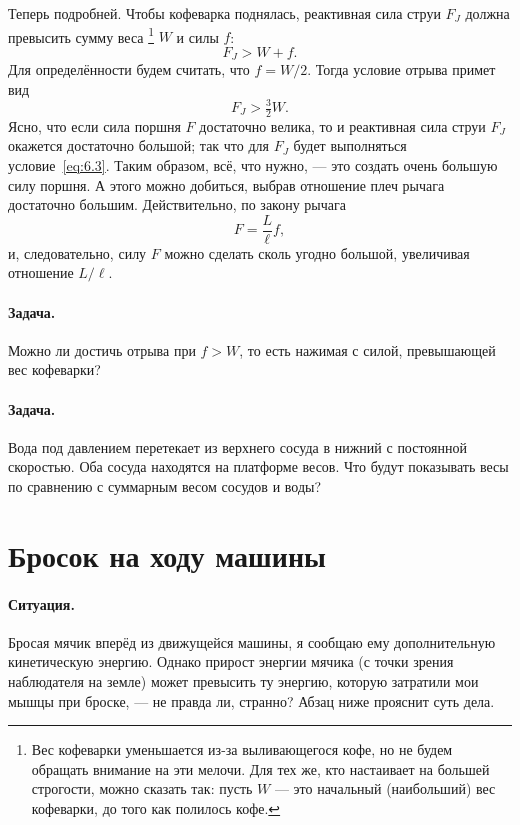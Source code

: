 Теперь подробней.
Чтобы кофеварка поднялась, реактивная сила струи $F_J$ должна превысить сумму веса%
\footnote{Вес кофеварки уменьшается из-за выливающегося кофе, но не будем обращать внимание на эти мелочи.
Для тех же, кто настаивает на большей строгости, можно сказать так: пусть $W$ --- это начальный (наибольший) вес кофеварки, до того как полилось кофе.}
$W$ и силы $f$:
\begin{equation}
F_J>W+f.
\label{eq:6.2}
\end{equation}
Для определённости будем считать, что $f=W/2$.
Тогда условие отрыва примет вид
\begin{equation}
F_J > \tfrac32W.
\label{eq:6.3}
\end{equation}
Ясно, что если сила поршня $F$ достаточно велика,
то и реактивная сила струи $F_J$ окажется достаточно большой;
так что для $F_J$ будет выполняться условие~\eqref{eq:6.3}.
Таким образом, всё, что нужно, --- это создать очень большую силу поршня.
А этого можно добиться, выбрав отношение плеч рычага достаточно большим.
Действительно, по закону рычага
\[
F=\frac{L}{\ell} f,
\]
и, следовательно, силу $F$ можно сделать сколь угодно большой,
увеличивая отношение $L/\ell$.

\paragraph{Задача.}
Можно ли достичь отрыва при $f > W$, то есть нажимая с силой, превышающей вес кофеварки?

\paragraph{Задача.}
Вода под давлением перетекает из верхнего сосуда в нижний с постоянной скоростью.
Оба сосуда находятся на платформе весов.
Что будут показывать весы по сравнению с суммарным весом сосудов и воды?

\section{Бросок на ходу машины}\label{Мячик из машины}

\paragraph{Ситуация.}
Бросая мячик вперёд из движущейся машины, я сообщаю ему дополнительную кинетическую энергию.
Однако прирост энергии мячика (с точки зрения наблюдателя на земле) может превысить ту энергию, которую затратили мои мышцы при броске, --- не правда ли, странно?
Абзац ниже прояснит суть дела.

